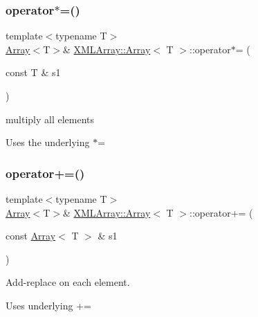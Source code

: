 \subsubsection{\texorpdfstring{operator$\ast$=()}{operator*=()}\hspace{0.1cm}{\footnotesize\ttfamily [6/6]}}
{\footnotesize\ttfamily template$<$typename T$>$ \\
\mbox{\hyperlink{classXMLArray_1_1Array}{Array}}$<$T$>$\& \mbox{\hyperlink{classXMLArray_1_1Array}{X\+M\+L\+Array\+::\+Array}}$<$ T $>$\+::operator$\ast$= (\begin{DoxyParamCaption}\item[{const T \&}]{s1 }\end{DoxyParamCaption})\hspace{0.3cm}{\ttfamily [inline]}}



multiply all elements 

Uses the underlying $\ast$= \mbox{\label{classXMLArray_1_1Array_ab8a6046aa7dbc0b3c43e4479b1eaf004}} 
\subsubsection{\texorpdfstring{operator+=()}{operator+=()}\hspace{0.1cm}{\footnotesize\ttfamily [1/6]}}
{\footnotesize\ttfamily template$<$typename T$>$ \\
\mbox{\hyperlink{classXMLArray_1_1Array}{Array}}$<$T$>$\& \mbox{\hyperlink{classXMLArray_1_1Array}{X\+M\+L\+Array\+::\+Array}}$<$ T $>$\+::operator+= (\begin{DoxyParamCaption}\item[{const \mbox{\hyperlink{classXMLArray_1_1Array}{Array}}$<$ T $>$ \&}]{s1 }\end{DoxyParamCaption})\hspace{0.3cm}{\ttfamily [inline]}}



Add-\/replace on each element. 

Uses underlying += \mbox{\label{classXMLArray_1_1Array_ab8a6046aa7dbc0b3c43e4479b1eaf004}} 
